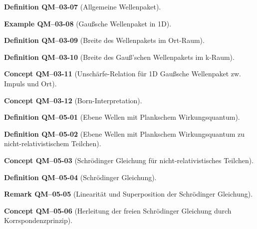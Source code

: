 \documentclass[10pt, letterpaper]{article}
\newcommand{\CustomHeading}[3]{%
  \par\medskip\noindent%
  \textbf{#1 #2} \textnormal{(#3)}.\enskip%
}
\newenvironment{DEF}[2]{\CustomHeading{Definition}{#1}{#2}}{}
\newenvironment{REM}[2]{\CustomHeading{Remark}{#1}{#2}}{}
\newenvironment{EXA}[2]{\CustomHeading{Example}{#1}{#2}}{}
\newenvironment{CONC}[2]{\CustomHeading{Concept}{#1}{#2}}{}
\begin{document}
\begin{DEF}{QM--03-07}{Allgemeine Wellenpaket}
\end{DEF}

\begin{EXA}{QM--03-08}{Gaußsche Wellenpaket in 1D}
\end{EXA}

\begin{DEF}{QM--03-09}{Breite des Wellenpakets im Ort-Raum}
\end{DEF}

\begin{DEF}{QM--03-10}{Breite des Gauß'schen Wellenpakets im k-Raum}
\end{DEF}

\begin{CONC}{QM--03-11}{Unschärfe-Relation für 1D Gaußsche Wellenpaket zw. Impuls und Ort}
\end{CONC}

\begin{CONC}{QM--03-12}{Born-Interpretation}
\end{CONC}

\begin{DEF}{QM--05-01}{Ebene Wellen mit Plankschem Wirkungsquantum}
\end{DEF}

\begin{DEF}{QM--05-02}{Ebene Wellen mit Plankschem Wirkungsquantum zu nicht-relativistischem Teilchen}
\end{DEF}

\begin{CONC}{QM--05-03}{Schrödinger Gleichung für nicht-relativistisches Teilchen}
\end{CONC}

\begin{DEF}{QM--05-04}{Schrödinger Gleichung}
\end{DEF}

\begin{REM}{QM--05-05}{Linearität und Superposition der Schrödinger Gleichung}
\end{REM}

\begin{CONC}{QM--05-06}{Herleitung der freien Schrödinger Gleichung durch Korrspondenzprinzip}
\end{CONC}
\end{document}
